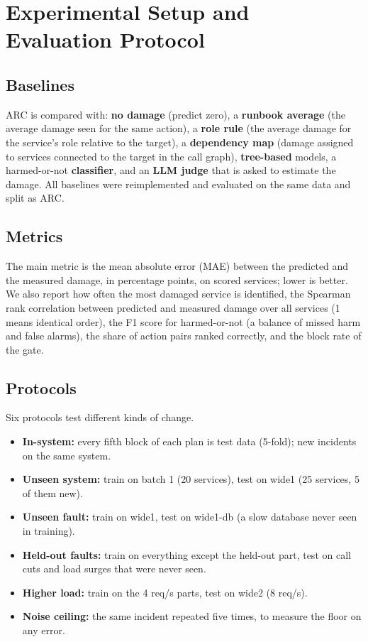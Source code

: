 \section{Experimental Setup and Evaluation Protocol}
\subsection{Baselines}
ARC is compared with: \textbf{no damage} (predict zero), a \textbf{runbook average} (the average damage seen for the same action), a \textbf{role rule} (the average damage for the service's role relative to the target), a \textbf{dependency map} (damage assigned to services connected to the target in the call graph), \textbf{tree-based} models, a harmed-or-not \textbf{classifier}, and an \textbf{LLM judge} that is asked to estimate the damage. All baselines were reimplemented and evaluated on the same data and split as ARC.

\subsection{Metrics}
The main metric is the mean absolute error (MAE) between the predicted and the measured damage, in percentage points, on scored services; lower is better. We also report how often the most damaged service is identified, the Spearman rank correlation between predicted and measured damage over all services (1 means identical order), the F1 score for harmed-or-not (a balance of missed harm and false alarms), the share of action pairs ranked correctly, and the block rate of the gate.

\subsection{Protocols}
Six protocols test different kinds of change.
\begin{itemize}
\item \textbf{In-system:} every fifth block of each plan is test data (5-fold); new incidents on the same system.
\item \textbf{Unseen system:} train on batch 1 (20 services), test on wide1 (25 services, 5 of them new).
\item \textbf{Unseen fault:} train on wide1, test on wide1-db (a slow database never seen in training).
\item \textbf{Held-out faults:} train on everything except the held-out part, test on call cuts and load surges that were never seen.
\item \textbf{Higher load:} train on the 4 req/s parts, test on wide2 (8 req/s).
\item \textbf{Noise ceiling:} the same incident repeated five times, to measure the floor on any error.
\end{itemize}

